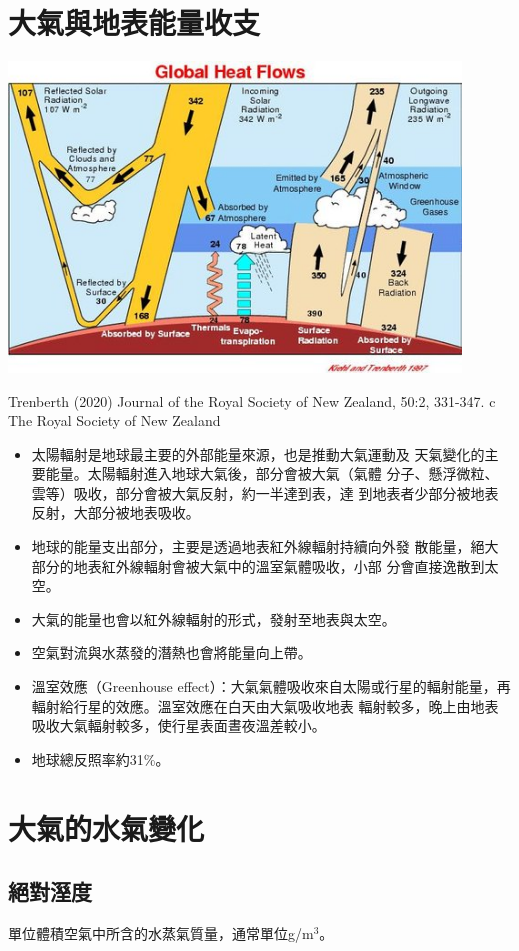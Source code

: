 \documentclass[a4paper,12pt]{report}
\begin{document}
\section{大氣與地表能量收支}
\bct\bfH\ctr\includegraphics[width=0.9\textwidth]{heat_flow.jpg}\caption{Trenberth (2020) Journal of the Royal Society of New Zealand, 50:2, 331-347. c The Royal Society of New Zealand}\efct
\begin{itemize}
  \item 太陽輻射是地球最主要的外部能量來源，也是推動大氣運動及 天氣變化的主要能量。太陽輻射進入地球大氣後，部分會被大氣（氣體 分子、懸浮微粒、雲等）吸收，部分會被大氣反射，約一半達到表，達 到地表者少部分被地表反射，大部分被地表吸收。
  \item 地球的能量支出部分，主要是透過地表紅外線輻射持續向外發 散能量，絕大部分的地表紅外線輻射會被大氣中的溫室氣體吸收，小部 分會直接逸散到太空。
  \item 大氣的能量也會以紅外線輻射的形式，發射至地表與太空。
  \item 空氣對流與水蒸發的潛熱也會將能量向上帶。
  \item 溫室效應（Greenhouse effect）：大氣氣體吸收來自太陽或行星的輻射能量，再輻射給行星的效應。溫室效應在白天由大氣吸收地表 輻射較多，晚上由地表吸收大氣輻射較多，使行星表面晝夜溫差較小。
  \item 地球總反照率約31\%。
\end{itemize}
\section{大氣的水氣變化}
\subsection{絕對溼度}
單位體積空氣中所含的水蒸氣質量，通常單位g/m$^3$。
\end{document}
